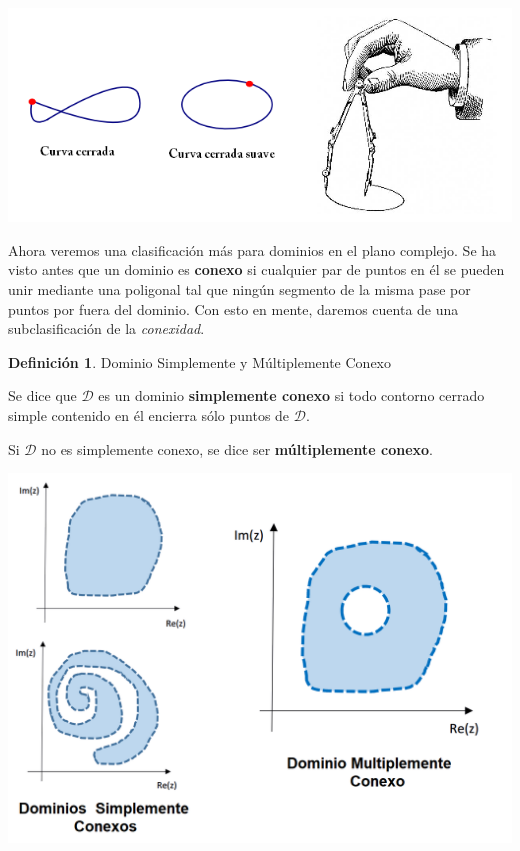 \documentclass[12pt]{article}
\theoremstyle{definition}
\newtheorem{definition}{Definici\'on}[section]
\theoremstyle{theorem}
\theoremstyle{corolary}
\begin{document}
\begin{center}
	\includegraphics[scale=1]{curva3.png}
\end{center}

Ahora veremos una clasificaci\'on m\'as para dominios en el plano complejo. Se ha visto antes que un dominio es \textbf{conexo} si cualquier par de puntos en \'el se pueden unir mediante una poligonal tal que ning\'un segmento de la misma pase por puntos por fuera del dominio. Con esto en mente, daremos cuenta de una subclasificaci\'on de la \textit{conexidad}.\\

\colorbox{orange!40!white!80}{\parbox{\linewidth}{
\theoremstyle{definition}
\begin{definition}{Dominio Simplemente y M\'ultiplemente Conexo}

Se dice que $\mathcal{D}$ es un dominio \textbf{simplemente conexo} si todo contorno cerrado simple contenido en \'el encierra s\'olo puntos de $\mathcal{D}$.

Si $\mathcal{D}$ no es simplemente conexo, se dice ser \textbf{m\'ultiplemente conexo}.
\end{definition}}}
\linebreak
\linebreak

\begin{center}
	\includegraphics[scale=0.5]{dominios.png}
\end{center}
\end{document}

